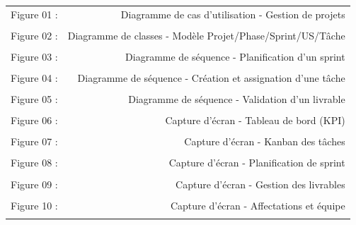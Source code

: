 \begin{longtable}{p{}r}
Figure 01 : & Diagramme de cas d'utilisation - Gestion de projets \\ \dotfill \\
Figure 02 : & Diagramme de classes - Modèle Projet/Phase/Sprint/US/Tâche \\ \dotfill \\
Figure 03 : & Diagramme de séquence - Planification d'un sprint \\ \dotfill \\
Figure 04 : & Diagramme de séquence - Création et assignation d'une tâche \\ \dotfill \\
Figure 05 : & Diagramme de séquence - Validation d'un livrable \\ \dotfill \\
Figure 06 : & Capture d'écran - Tableau de bord (KPI) \\ \dotfill \\
Figure 07 : & Capture d'écran - Kanban des tâches \\ \dotfill \\
Figure 08 : & Capture d'écran - Planification de sprint \\ \dotfill \\
Figure 09 : & Capture d'écran - Gestion des livrables \\ \dotfill \\
Figure 10 : & Capture d'écran - Affectations et équipe \\ \dotfill \\
\end{longtable}

\begin{titlepage}
\thispagestyle{empty}
\end{titlepage} 